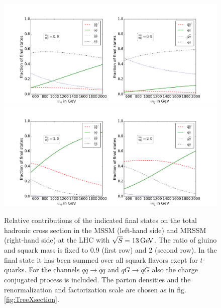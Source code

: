 \begin{figure}[!htpb]
\begin{center}
\includegraphics[scale=.4]{figures/rel_weights_mr=0,9_MSSM+MRSSM}
\includegraphics[scale=.4]{figures/rel_weights_mr=2_MSSM+MRSSM}
\caption{Relative contributions of the indicated final states on the total hadronic cross section in the MSSM (left-hand side) and MRSSM (right-hand side) at the LHC with \mbox{$\sqrt{S} = \unit[13]{GeV}$}. The ratio of gluino and squark mass is fixed to 0.9 (first row) and 2 (second row). In the final state it has been summed over all squark flavors exept for $t$-quarks. For the channels $qq \to \tilde{q}\tilde{q}$ and $qG \to \tilde{q}\tilde{G}$ also the charge conjugated process is included. The parton densities and the renormalization and factorization scale are chosen as in fig. \ref{fig:TreeXsection}.}\label{fig:TreeLevelSigma_0,9_2}
\end{center}
\end{figure}

